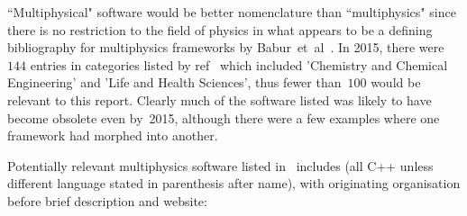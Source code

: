 ``Multiphysical" software would be better nomenclature than ``multiphysics" since there
is no restriction to the field of physics
in what appears to be a defining bibliography for multiphysics frameworks by Babur~et~al~\cite{Ba15Mult}.
In 2015, there were $144$ entries in categories listed by ref~\cite{Ba15Mult} which
included 'Chemistry and Chemical Engineering' and 'Life and Health Sciences', thus
fewer than~$100$ would be relevant to this report. Clearly much
of the software listed was likely to have become obsolete even by~2015,
although there were a few examples where one framework had morphed into another.

Potentially relevant multiphysics software listed in~\cite{Ba15Mult} includes
(all C++ unless different language stated in parenthesis after name), with originating
organisation before brief description and website:
